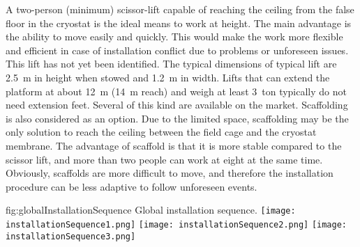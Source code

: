 A two-person (minimum) scissor-lift capable of reaching the ceiling from the false floor in the cryostat is the ideal means to work at height.
The main advantage is the ability to move easily and quickly.
This would make the work more flexible and efficient in case of installation conflict due to problems or unforeseen issues.
This lift has not yet been identified.
The typical dimensions of typical lift are 2.5~m in height when stowed and 1.2~m in width.
Lifts that can extend the platform at about 12~m (14~m reach) and weigh at least 3~ton typically do not need extension feet.
Several of this kind are available on the market.
Scaffolding is also considered as an option.
Due to the limited space, scaffolding may be the only solution to reach the ceiling between the field cage and the cryostat membrane.
The advantage of scaffold is that it is more stable compared to the scissor lift, and more than two people can work at eight at the same time.
Obviously, scaffolds are more difficult to move, and therefore the installation procedure can be less adaptive to follow unforeseen events.

\begin{dunefigure}{fig:globalInstallationSequence}
{Global installation sequence.}
\texttt{[image: installationSequence1.png]}
\texttt{[image: installationSequence2.png]}
\texttt{[image: installationSequence3.png]}
\end{dunefigure}

